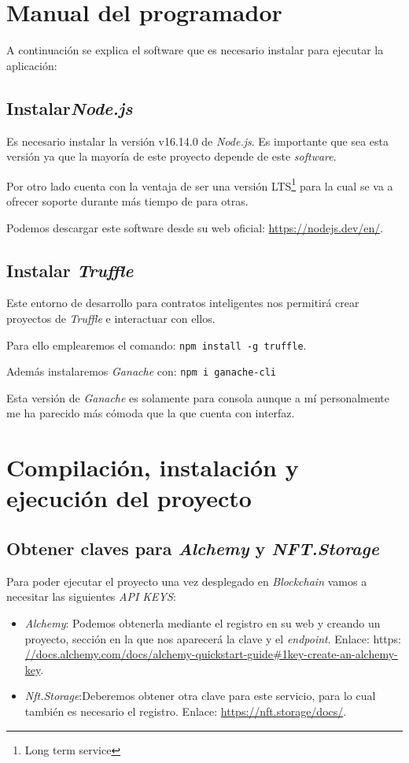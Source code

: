\section{Manual del programador}
A continuación se explica el software que es necesario instalar para ejecutar la aplicación:
\subsection{Instalar\textit{Node.js}}
Es necesario instalar la versión v16.14.0 de \textit{Node.js}. Es importante que sea esta versión ya que la mayoría de este proyecto depende de este \textit{software}.

Por otro lado cuenta con la ventaja de ser una versión LTS\footnote{Long term service} para la cual se va a ofrecer soporte durante más tiempo de para otras.

Podemos descargar este software desde su web oficial: 
\url{https://nodejs.dev/en/}.

\subsection{Instalar \textit{Truffle}}

Este entorno de desarrollo para contratos inteligentes nos permitirá crear proyectos de \textit{Truffle} e interactuar con ellos.

Para ello emplearemos el comando: \texttt{npm install -g truffle}.

Además instalaremos  \textit{Ganache} con: \texttt{npm i ganache-cli}

Esta versión de \textit{Ganache} es solamente para consola aunque a mí personalmente me ha parecido más cómoda que la que cuenta con interfaz.

\section{Compilación, instalación y ejecución del proyecto}

\subsection{Obtener claves para  \textit{Alchemy} y \textit{NFT.Storage}}
Para poder ejecutar el proyecto una vez desplegado en \textit{Blockchain} vamos a necesitar las siguientes \textit{API KEYS}:

\begin{itemize}
    \item \textit{Alchemy}: Podemos obtenerla mediante el registro en su web y creando un proyecto, sección en la que nos aparecerá la clave y el \textit{endpoint}. Enlace: https: \url{//docs.alchemy.com/docs/alchemy-quickstart-guide\#1key-create-an-alchemy-key}.
    \item \textit{Nft.Storage}:Deberemos obtener otra clave para este servicio, para lo cual también es necesario el registro. Enlace: \url{https://nft.storage/docs/}.
\end{itemize}

